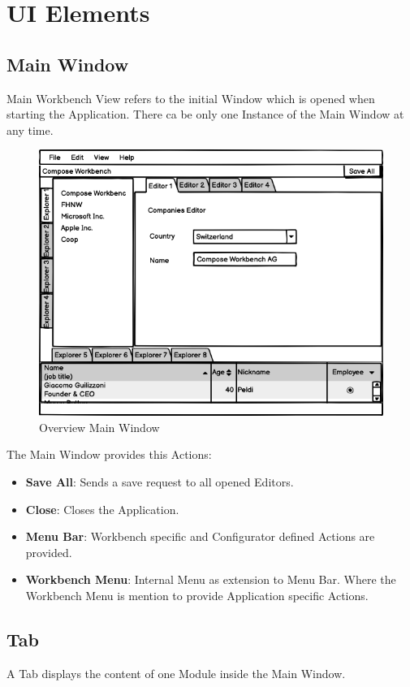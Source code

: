 \section{UI Elements}

\subsection{Main Window}
Main Workbench View refers to the initial Window which is opened when starting the Application. There ca be only one Instance of the Main Window at any time.

\begin{figure}[H]
    \includegraphics[width=1\linewidth]{images/WorkbenchCompose.png}
    \caption{Overview Main Window}
\end{figure}


The Main Window provides this Actions:
\begin{itemize}
    \item \textbf{Save All}: Sends a save request to all opened Editors.
    \item \textbf{Close}: Closes the Application.
    \item \textbf{Menu Bar}: Workbench specific and Configurator defined Actions are provided.
    \item \textbf{Workbench Menu}: Internal Menu as extension to Menu Bar. Where the Workbench Menu is mention to provide Application specific Actions.
\end{itemize}

\subsection{Tab}
A Tab displays the content of one Module inside the Main Window.

